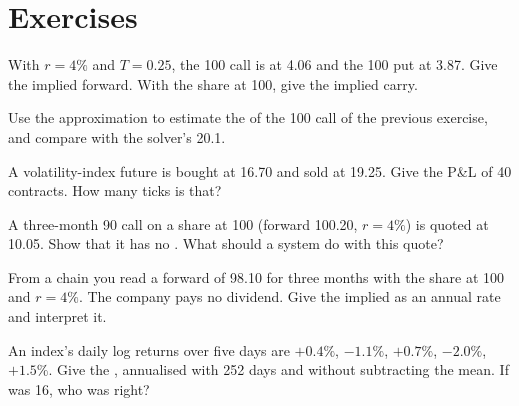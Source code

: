 \section{Exercises}

\begin{exercise}[$\star$]\label{exo:m1:volatility-first-contact:1}
With $r = 4\%$ and $T = 0.25$, the 100 call is at 4.06 and the 100 put at 3.87.
Give the implied forward. With the share at 100, give the implied carry.
\end{exercise}

\begin{exercise}[$\star$]\label{exo:m1:volatility-first-contact:2}
Use the  approximation to estimate the  of the
100 call of the previous exercise, and compare with the solver's 20.1.
\end{exercise}

\begin{exercise}[$\star$]\label{exo:m1:volatility-first-contact:3}
A volatility-index future is bought at 16.70 and sold at 19.25. Give the
P\&L of 40 contracts. How many ticks is that?
\end{exercise}

\begin{exercise}[$\star\star$]\label{exo:m1:volatility-first-contact:4}
A three-month 90 call on a share at 100 (forward 100.20, $r = 4\%$) is quoted
at 10.05. Show that it has no . What should a system do
with this quote?
\end{exercise}

\begin{exercise}[$\star\star$]\label{exo:m1:volatility-first-contact:5}
From a chain you read a forward of 98.10 for three months with the share at
100 and $r = 4\%$. The company pays no dividend. Give the implied 
as an annual rate and interpret it.
\end{exercise}

\begin{exercise}[$\star\star$]\label{exo:m1:volatility-first-contact:6}
An index's daily log returns over five days are $+0.4\%$, $-1.1\%$, $+0.7\%$,
$-2.0\%$, $+1.5\%$. Give the , annualised with 252 days and
without subtracting the mean. If  was 16, who was right?
\end{exercise}

